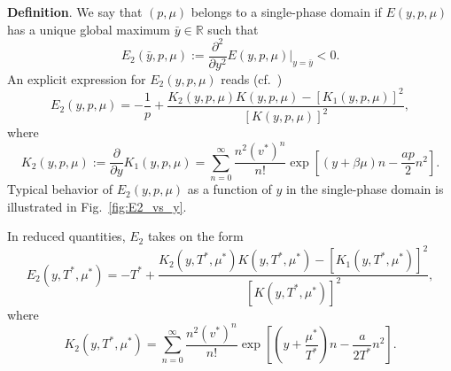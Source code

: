 \documentclass[12pt]{article}
\numberwithin{equation}{section}
\begin{document}
	\textbf{Definition}. We say that $(p, \mu)$ belongs to a single-phase domain if $E(y,p,\mu)$ has a unique global maximum $\bar{y} \in \mathbb{R}$ such that
	\begin{equation}
		E_2(\bar{y}, p, \mu) := \frac{\partial^2}{\partial y^2} E(y,p,\mu)\big|_{y=\bar{y}} < 0.
	\end{equation}
	An explicit expression for $E_2(y,p,\mu)$ reads (cf.~\cite[(20)]{KD22})
	\begin{equation}
		E_2(y,p,\mu) = -\frac{1}{p} + \frac{K_2(y,p,\mu) K(y,p,\mu) - [K_1(y,p,\mu)]^2}{[K(y,p,\mu)]^2},
	\end{equation}
	where
	\begin{equation}
		K_2(y,p,\mu) := \frac{\partial}{\partial y} K_1(y,p,\mu) = \sum_{n=0}^{\infty} \frac{n^2 (v^*)^n}{n!} \exp[(y+\beta\mu)n - \frac{ap}{2}n^2].
	\end{equation}
	Typical behavior of $E_2(y,p,\mu)$ as a function of $y$ in the single-phase domain is illustrated in Fig.~\ref{fig:E2_vs_y}.
	
	\begin{mdframed}[linecolor=black,linewidth=1pt,leftline=true]
		In reduced quantities, $E_2$ takes on the form
		\begin{equation}
			E_2(y,T^*,\mu^*) = -T^* + \frac{K_2(y,T^*,\mu^*) K(y,T^*,\mu^*) - [K_1(y,T^*,\mu^*)]^2}{[K(y,T^*,\mu^*)]^2},
		\end{equation}
		where
		\begin{equation}
			K_2(y,T^*,\mu^*) = \sum_{n=0}^{\infty} \frac{n^2 (v^*)^n}{n!} \exp[\left(y+\frac{\mu^*}{T^*}\right)n - \frac{a}{2T^*}n^2].
		\end{equation}
	\end{mdframed}
	
\end{document}
